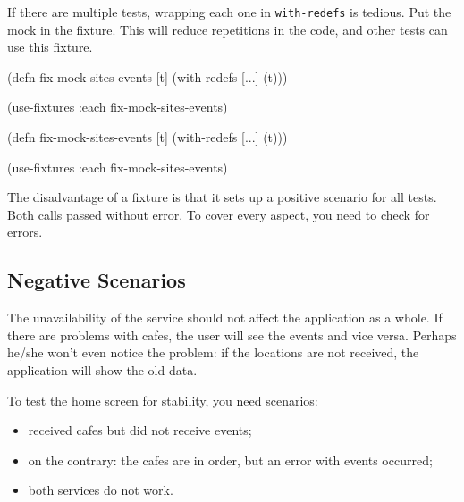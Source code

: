 
If there are multiple tests, wrapping each one in \verb|with-redefs| is tedious. Put the mock in the fixture. This will reduce repetitions in the code, and other tests can use this fixture.

\ifx\DEVICETYPE\MOBILE

\begin{english}
  \begin{clojure}
(defn fix-mock-sites-events [t]
  (with-redefs [...]
    (t)))

(use-fixtures :each
  fix-mock-sites-events)
  \end{clojure}
\end{english}

\else

\begin{english}
  \begin{clojure}
(defn fix-mock-sites-events [t]
  (with-redefs [...]
    (t)))

(use-fixtures :each fix-mock-sites-events)
  \end{clojure}
\end{english}

\fi

The disadvantage of a fixture is that it sets up a positive scenario for all tests. Both calls passed without error. To cover every aspect, you need to check for errors.

\subsection{Negative Scenarios}


The unavailability of the service should not affect the application as a whole. If there are problems with cafes, the user will see the events and vice versa. Perhaps he/she won't even notice the problem: if the locations are not received, the application will show the old data.

To test the home screen for stability, you need scenarios:

\begin{itemize}

\item
  received cafes but did not receive events;

\item
  on the contrary: the cafes are in order, but an error with events occurred;

\item
  both services do not work.

\end{itemize}

